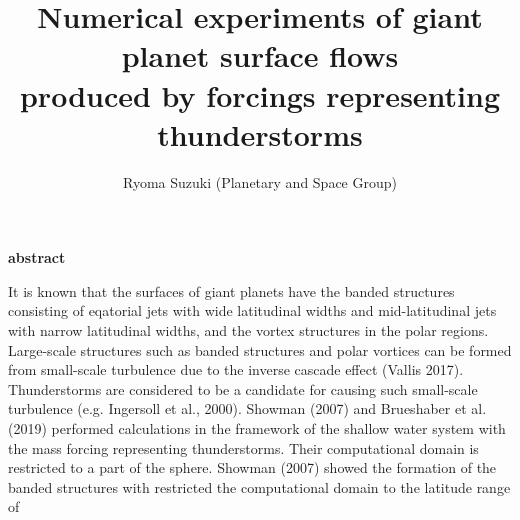 \documentclass[a4j,8pt]{jarticle}
\begin{document}
\pagestyle{empty} 
\title{\Large Numerical experiments of giant planet surface flows  \\
produced by forcings representing thunderstorms
}

\author{\large Ryoma Suzuki (Planetary and Space Group)}
\date{}
\maketitle
\begin{center}
\bf \large abstract
\end{center}
%
It is known that the surfaces of giant planets have
the banded structures consisting of eqatorial jets with wide latitudinal widths
and mid-latitudinal jets with narrow latitudinal widths, and
the vortex structures in the polar regions.
%
Large-scale structures such as banded structures and polar vortices
can be formed from small-scale turbulence due to the inverse cascade effect (Vallis 2017).
Thunderstorms are considered to be
a candidate for causing such small-scale turbulence (e.g. Ingersoll et al., 2000).
%
Showman (2007) and Brueshaber et al. (2019) performed calculations 
in the framework of the shallow water system
with the mass forcing representing thunderstorms.
Their computational domain is restricted to a part of the sphere.
%
%
Showman (2007) showed the formation of the banded structures 
with restricted the computational domain to the latitude range of
\end{document}
